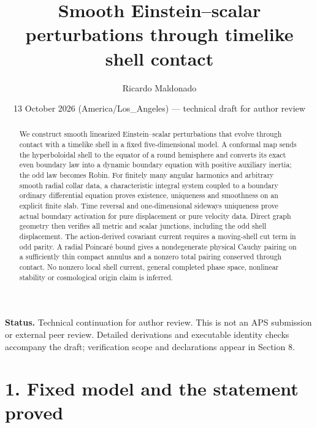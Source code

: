 \documentclass[
  10pt,
]{article}
\title{Smooth Einstein--scalar perturbations through timelike shell
contact}
\author{Ricardo Maldonado}
\date{13 October 2026 (America/Los\_Angeles) --- technical draft for
author review}
\begin{document}
\maketitle
\begin{abstract}
We construct smooth linearized Einstein--scalar perturbations that
evolve through contact with a timelike shell in a fixed five-dimensional
model. A conformal map sends the hyperboloidal shell to the equator of a
round hemisphere and converts its exact even boundary law into a dynamic
boundary equation with positive auxiliary inertia; the odd law becomes
Robin. For finitely many angular harmonics and arbitrary smooth radial
collar data, a characteristic integral system coupled to a boundary
ordinary differential equation proves existence, uniqueness and
smoothness on an explicit finite slab. Time reversal and one-dimensional
sideways uniqueness prove actual boundary activation for pure
displacement or pure velocity data. Direct graph geometry then verifies
all metric and scalar junctions, including the odd shell displacement.
The action-derived covariant current requires a moving-shell cut term in
odd parity. A radial Poincaré bound gives a nondegenerate physical
Cauchy pairing on a sufficiently thin compact annulus and a nonzero
total pairing conserved through contact. No nonzero local shell current,
general completed phase space, nonlinear stability or cosmological
origin claim is inferred.
\end{abstract}

\textbf{Status.} Technical continuation for author review. This is not
an APS submission or external peer review. Detailed derivations and
executable identity checks accompany the draft; verification scope and
declarations appear in Section 8.

\section{1. Fixed model and the statement
proved}\label{fixed-model-and-the-statement-proved}
\end{document}
